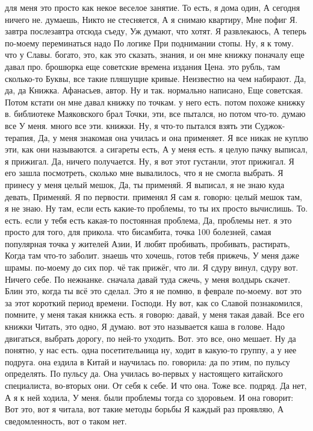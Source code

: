 для меня это просто как некое веселое занятие. То есть, я дома один,
А сегодня ничего не.
думаешь, Никто не стесняется, А я снимаю квартиру, Мне пофиг Я.
завтра послезавтра отсюда съеду, Уж думают, что хотят. Я развлекаюсь, А теперь по-моему переминаться надо По логике При поднимании стопы. Ну, я к тому.
что у Славы.
богато, это, как это сказать, знания, и он мне книжку поначалу еще давал про.
брошюрка еще советские времена издания Цена.
это рубль, там сколько-то Буквы, все такие пляшущие кривые.
Неизвестно на чем набирают.
Да, да, да Книжка.
Афанасьев, автор. Ну и так.
нормально написано, Еще советская. Потом кстати он мне давал книжку по точкам. у него есть.
потом похоже книжку в.
библиотеке Маяковского брал Точки, эти, все пытался, но потом что-то.
думаю все У меня.
много все эти.
книжки. Ну, я что-то пытался взять эти Суджок-терапия, Да, у меня знакомая она училась и она применяет. Я все никак не куплю эти, как они называются.
а сигареты есть, А у меня есть. я целую пачку выписал, я прижигал.
Да, ничего получается. Ну, я вот этот густанли, этот прижигал. Я его зашла посмотреть, сколько мне вывалилось, что я не смогла выбрать. Я принесу у меня целый мешок, Да, ты применяй. Я выписал, я не знаю куда девать, Применяй.
Я по первости.
применял Я сам я.
говорю: целый мешок там, я не знаю.
Ну там, если есть какие-то проблемы, то ты их просто вычислишь. То.
есть. если у тебя есть какая-то постоянная проблема, Да, проблемы нет. я это просто для того, для прикола.
что бисамбита, точка 100 болезней, самая популярная точка у жителей Азии, И любят пробивать, пробивать, растирать, Когда там что-то заболит. знаешь что хочешь, готов тебя прижечь, У меня даже шрамы.
по-моему до сих пор.
чё так прижёг, что ли.
Я сдуру винул, сдуру вот.
Ничего себе.
По нежнанке. сначала давай туда сжечь, у меня волдырь скачет.
Блин это, когда ты всё это сделал.
Это я не помню, в феврале по-моему.
вот это за этот короткий период времени.
Господи.
Ну вот, как со Славой познакомился, помните, у меня такая книжка есть. я говорю: давай, у меня такая давай.
Все его книжки Читать, это одно, Я думаю. вот это называется каша в голове. Надо двигаться, выбрать дорогу, по ней-то уходить. Вот.
это все, оно мешает. Ну да понятно, у нас есть.
одна посетительница ну, ходит в какую-то группу, а у нее подруга. она ездила в Китай и научилась по.
говорила: да по этим, по пульсу определять.
По пульсу да.
Она училась во-первых у настоящего китайского специалиста, во-вторых они.
От себя к себе.
И что она.
Тоже все.
подряд. Да нет, А я к ней ходила, У меня.
были проблемы тогда со здоровьем. И она говорит: Вот это, вот я читала, вот такие методы борьбы Я каждый раз проявляю, А сведомленность, вот о таком нет.
